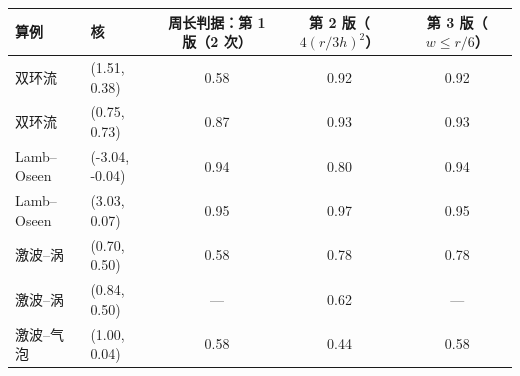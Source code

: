 \begin{tabular}{llccc}\toprule 算例 & 核 & 周长判据：第 1 版（2 次） & 第 2 版（$4(r/3h)^2$） & 第 3 版（$w\le r/6$）\\\midrule
双环流 & (1.51, 0.38) & 0.58 & 0.92 & 0.92\\
双环流 & (0.75, 0.73) & 0.87 & 0.93 & 0.93\\
Lamb–Oseen & (-3.04, -0.04) & 0.94 & 0.80 & 0.94\\
Lamb–Oseen & (3.03, 0.07) & 0.95 & 0.97 & 0.95\\
激波–涡 & (0.70, 0.50) & 0.58 & 0.78 & 0.78\\
激波–涡 & (0.84, 0.50) & — & 0.62 & —\\
激波–气泡 & (1.00, 0.04) & 0.58 & 0.44 & 0.58\\
\bottomrule\end{tabular}